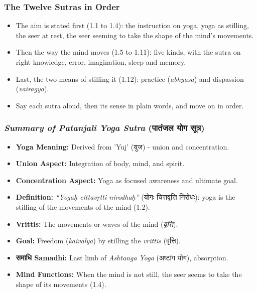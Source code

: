 \begin{frame}[fragile]\frametitle{The Twelve Sutras in Order}

    \begin{itemize}
        \item The aim is stated first (1.1 to 1.4): the instruction on yoga, yoga as stilling, the seer at rest, the seer seeming to take the shape of the mind's movements.
        \item Then the way the mind moves (1.5 to 1.11): five kinds, with the sutra on right knowledge, error, imagination, sleep and memory.
        \item Last, the two means of stilling it (1.12): practice (\textit{abhyasa}) and dispassion (\textit{vairagya}).
        \item Say each sutra aloud, then its sense in plain words, and move on in order.
    \end{itemize}

\end{frame}


\begin{frame}[fragile]\frametitle{\textit{Summary of Patanjali Yoga Sutra} (पातंजल योग सूत्र)}

    \begin{itemize}
        \item \textbf{Yoga Meaning:} Derived from 'Yuj' (युज) - union and concentration.
        \item \textbf{Union Aspect:} Integration of body, mind, and spirit.
        \item \textbf{Concentration Aspect:} Yoga as focused awareness and ultimate goal.
        \item \textbf{Definition:} \textit{“Yogaḥ cittavṛtti nirodhaḥ”} (योगः चित्तवृत्ति निरोधः): yoga is the stilling of the movements of the mind (1.2).
        \item \textbf{Vrittis:} The movements or waves of the mind (\textit{वृत्ति}).
        \item \textbf{Goal:} Freedom (\textit{kaivalya}) by stilling the \textit{vrittis} (वृत्ति).
        \item \textbf{समाधि Samadhi:} Last limb of \textit{Ashtanga Yoga} (अष्टांग योग), absorption.
        \item \textbf{Mind Functions:} When the mind is not still, the seer seems to take the shape of its movements (1.4).
    \end{itemize}

\end{frame}

